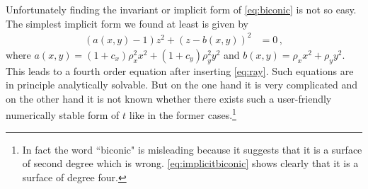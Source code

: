 \documentclass[12pt,a4paper,twoside,openright,BCOR10mm,headsepline,titlepage,abstracton,chapterprefix,final]{scrreprt}
\begin{document}
Unfortunately finding the invariant or implicit form of \eqref{eq:biconic} is not so easy. The simplest implicit form we found at least is given by
\begin{align}
 (a(x,y) - 1) z^2 + (z - b(x,y))^2 &= 0\,,\label{eq:implicitbiconic}
\end{align}
where $a(x,y) = (1 + c_x) \rho_x^2 x^2 + (1 + c_y) \rho_y^2 y^2$ and $b(x,y) = \rho_x x^2 + \rho_y y^2$. 
This leads to a fourth order equation after inserting \eqref{eq:ray}.
Such equations are in principle analytically solvable. But on the one hand it is very complicated and on the other hand 
it is not known whether there exists such a user-friendly numerically stable form of $t$ like in the former cases.\footnote{
In fact the word ``biconic" is misleading because it suggests that
it is a surface of second degree which is wrong. \eqref{eq:implicitbiconic}
shows clearly that it is a surface of degree four.}
\end{document}

